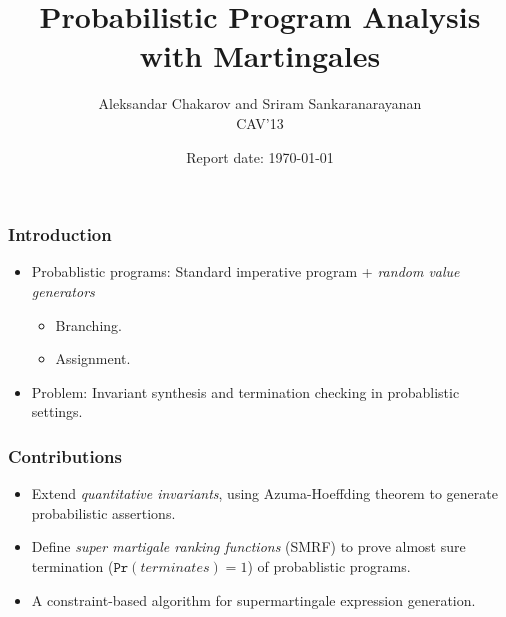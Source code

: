 \documentclass[11pt]{beamer}
\title{Probabilistic Program Analysis with Martingales}
\author{Aleksandar Chakarov and Sriram Sankaranarayanan\\
CAV'13
}
\date{Report date: \today}
\begin{document}
\maketitle
\begin{frame}\frametitle{Introduction}

\begin{itemize}
\item 
Probablistic programs: Standard imperative program + \emph{random value generators}


\begin{itemize}
\item Branching.

\item Assignment.

\end{itemize}

\item 
Problem: Invariant synthesis and termination checking in probablistic settings.



\end{itemize}
\end{frame}

\begin{frame}\frametitle{Contributions}
\begin{itemize}
\item Extend \emph{quantitative invariants}, using Azuma-Hoeffding theorem to generate probabilistic assertions.

\item Define \emph{super martigale ranking functions} (SMRF) to prove almost sure termination ($\texttt{Pr}(terminates) = 1$) of probablistic programs.
\item A constraint-based algorithm for supermartingale expression generation.
\end{itemize}
\end{frame}
\end{document}
